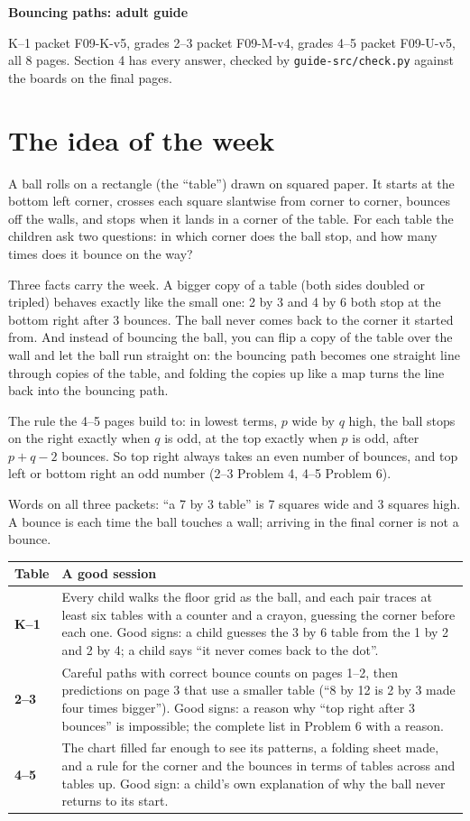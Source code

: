 \documentclass[11pt,letterpaper]{article}
\begin{document}
{\LARGE\bfseries Bouncing paths: adult guide}\par
\smallskip
{\small K--1 packet F09-K-v5, grades 2--3 packet F09-M-v4, grades 4--5 packet F09-U-v5, all 8 pages. Section 4 has every answer, checked by \texttt{guide-src/check.py} against the boards on the final pages.}

\section{The idea of the week}

A ball rolls on a rectangle (the ``table'') drawn on squared paper. It starts at the bottom left corner, crosses each square slantwise from corner to corner, bounces off the walls, and stops when it lands in a corner of the table. For each table the children ask two questions: in which corner does the ball stop, and how many times does it bounce on the way?

Three facts carry the week. A bigger copy of a table (both sides doubled or tripled) behaves exactly like the small one: 2 by 3 and 4 by 6 both stop at the bottom right after 3 bounces. The ball never comes back to the corner it started from. And instead of bouncing the ball, you can flip a copy of the table over the wall and let the ball run straight on: the bouncing path becomes one straight line through copies of the table, and folding the copies up like a map turns the line back into the bouncing path.

The rule the 4--5 pages build to: in lowest terms, $p$ wide by $q$ high, the ball stops on the right exactly when $q$ is odd, at the top exactly when $p$ is odd, after $p+q-2$ bounces. So top right always takes an even number of bounces, and top left or bottom right an odd number (2--3 Problem 4, 4--5 Problem 6).

Words on all three packets: ``a 7 by 3 table'' is 7 squares wide and 3 squares high. A bounce is each time the ball touches a wall; arriving in the final corner is not a bounce.

\medskip
\begin{tabularx}{\linewidth}{@{}>{\bfseries}l X@{}}
\toprule
Table & A good session \\
\midrule
K--1 & Every child walks the floor grid as the ball, and each pair traces at least six tables with a counter and a crayon, guessing the corner before each one. Good signs: a child guesses the 3 by 6 table from the 1 by 2 and 2 by 4; a child says ``it never comes back to the dot''.\\
2--3 & Careful paths with correct bounce counts on pages 1--2, then predictions on page 3 that use a smaller table (``8 by 12 is 2 by 3 made four times bigger''). Good signs: a reason why ``top right after 3 bounces'' is impossible; the complete list in Problem 6 with a reason.\\
4--5 & The chart filled far enough to see its patterns, a folding sheet made, and a rule for the corner and the bounces in terms of tables across and tables up. Good sign: a child's own explanation of why the ball never returns to its start.\\
\bottomrule
\end{tabularx}
\end{document}
